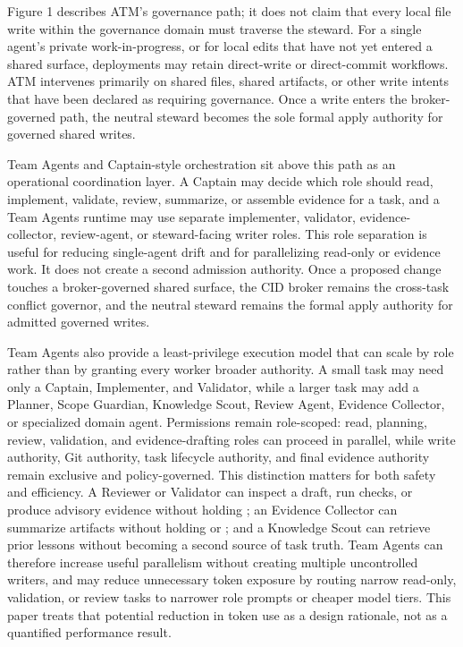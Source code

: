 \documentclass[9pt,letterpaper]{extarticle}
\begin{document}
Figure 1 describes ATM's governance path; it does not claim that every local file write within the governance domain must traverse the steward. For a single agent's private work-in-progress, or for local edits that have not yet entered a shared surface, deployments may retain direct-write or direct-commit workflows. ATM intervenes primarily on shared files, shared artifacts, or other write intents that have been declared as requiring governance. Once a write enters the broker-governed path, the neutral steward becomes the sole formal apply authority for governed shared writes.

Team Agents and Captain-style orchestration sit above this path as an operational coordination layer. A Captain may decide which role should read, implement, validate, review, summarize, or assemble evidence for a task, and a Team Agents runtime may use separate implementer, validator, evidence-collector, review-agent, or steward-facing writer roles. This role separation is useful for reducing single-agent drift and for parallelizing read-only or evidence work. It does not create a second admission authority. Once a proposed change touches a broker-governed shared surface, the CID broker remains the cross-task conflict governor, and the neutral steward remains the formal apply authority for admitted governed writes.

Team Agents also provide a least-privilege execution model that can scale by role rather than by granting every worker broader authority. A small task may need only a Captain, Implementer, and Validator, while a larger task may add a Planner, Scope Guardian, Knowledge Scout, Review Agent, Evidence Collector, or specialized domain agent. Permissions remain role-scoped: read, planning, review, validation, and evidence-drafting roles can proceed in parallel, while write authority, Git authority, task lifecycle authority, and final evidence authority remain exclusive and policy-governed. This distinction matters for both safety and efficiency. A Reviewer or Validator can inspect a draft, run checks, or produce advisory evidence without holding \texttt{}; an Evidence Collector can summarize artifacts without holding \texttt{} or \texttt{}; and a Knowledge Scout can retrieve prior lessons without becoming a second source of task truth. Team Agents can therefore increase useful parallelism without creating multiple uncontrolled writers, and may reduce unnecessary token exposure by routing narrow read-only, validation, or review tasks to narrower role prompts or cheaper model tiers. This paper treats that potential reduction in token use as a design rationale, not as a quantified performance result.
\end{document}
